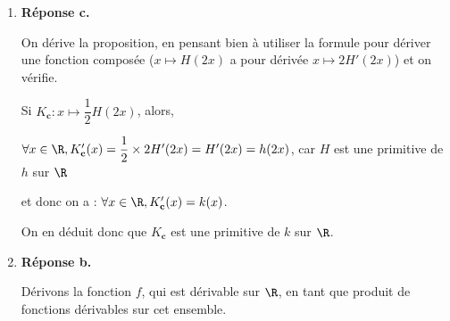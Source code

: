 \begin{enumerate}
%
%
%
%
%
%
%
%
%
%
%
			\item \textbf{Réponse c.}

			On dérive la proposition, en pensant bien à utiliser la formule pour dériver une fonction composée ($x\longmapsto H(2x)$ a pour dérivée $x \longmapsto 2H'(2x)$) et on vérifie.

			Si $K_\textbf{c} : x \longmapsto \dfrac{1}{2} H(2x)$, alors,

			$\forall x \in \R, K_\textbf{c}' (x) = \dfrac{1}{2}\times 2H'(2x) = H'(2x) = h(2x)$, car $H$ est une primitive de $h$ sur $\R$

			et donc on a : $\forall x \in \R, K_\textbf{c}' (x) = k(x)$.

			On en déduit donc que $K_\textbf{c}$ est une primitive de $k$ sur $\R$.

			\item \textbf{Réponse b.}

			Dérivons la fonction $f$, qui est dérivable sur $\R$, en tant que produit de fonctions dérivables sur cet ensemble.


\end{enumerate}
